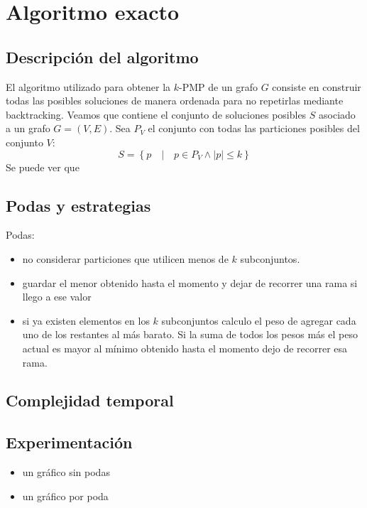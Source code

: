 \section{Algoritmo exacto}

\subsection{Descripción del algoritmo}
El algoritmo utilizado para obtener la $k$-PMP de un grafo $G$ consiste en construir 
todas las posibles soluciones de manera ordenada para no repetirlas mediante backtracking.
Veamos que contiene el conjunto de soluciones posibles $S$ asociado a un grafo $G = (V, E)$.
Sea $P_V$ el conjunto con todas las particiones posibles del conjunto $V$:
\begin{displaymath}
  S = \left\{p \quad | \quad p \in P_V \land \left\vert{p}\right\vert \leq k\right\}
\end{displaymath}
Se puede ver que 

\subsection{Podas y estrategias}
Podas:
\begin{itemize}
  \item no considerar particiones que utilicen menos de $k$ subconjuntos.
  \item guardar el menor obtenido hasta el momento y dejar de recorrer una rama si llego a ese valor
  \item si ya existen elementos en los $k$ subconjuntos calculo el peso de agregar cada uno de los 
    restantes al más barato. Si la suma de todos los pesos más el peso actual es mayor al mínimo
    obtenido hasta el momento dejo de recorrer esa rama.
\end{itemize}

\subsection{Complejidad temporal}


\subsection{Experimentación}
\begin{itemize}
  \item un gráfico sin podas
  \item un gráfico por poda
\end{itemize}
